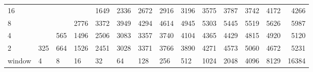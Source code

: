 \begin{table}[h]
{\begin{tabular}{lrrrrrrrrrrrrr}
			\multicolumn{1}{|l|}{16} &  &  &  & \cellcolor[HTML]{E69900}1649 & \cellcolor[HTML]{E60000}2336 & \cellcolor[HTML]{E60000}2672 & \cellcolor[HTML]{E60000}2916 & \cellcolor[HTML]{E60000}3196 & \cellcolor[HTML]{9900E6}3575 & \cellcolor[HTML]{9900E6}3787 & \cellcolor[HTML]{9900E6}3742 & \cellcolor[HTML]{9900E6}4172 & \cellcolor[HTML]{4C00E6}4266 \\ \cline{1-1}
			\multicolumn{1}{|l|}{8} &  &  & \cellcolor[HTML]{E60000}2776 & \cellcolor[HTML]{9900E6}3372 & \cellcolor[HTML]{9900E6}3949 & \cellcolor[HTML]{4C00E6}4294 & \cellcolor[HTML]{4C00E6}4614 & \cellcolor[HTML]{4C00E6}4945 & \cellcolor[HTML]{4C00E6}5303 & \cellcolor[HTML]{4C00E6}5445 & \cellcolor[HTML]{4C00E6}5519 & \cellcolor[HTML]{4C00E6}5626 & \cellcolor[HTML]{4C00E6}5987 \\ \cline{1-1}
			\multicolumn{1}{|l|}{4} &  & \cellcolor[HTML]{99E600}565 & \cellcolor[HTML]{E69900}1496 & \cellcolor[HTML]{E60000}2506 & \cellcolor[HTML]{9900E6}3083 & \cellcolor[HTML]{9900E6}3357 & \cellcolor[HTML]{9900E6}3740 & \cellcolor[HTML]{4C00E6}4104 & \cellcolor[HTML]{4C00E6}4365 & \cellcolor[HTML]{4C00E6}4429 & \cellcolor[HTML]{4C00E6}4815 & \cellcolor[HTML]{4C00E6}4920 & \cellcolor[HTML]{4C00E6}5120 \\ \cline{1-1}
			\multicolumn{1}{|l|}{2} & \cellcolor[HTML]{99E600}325 & \cellcolor[HTML]{99E600}664 & \cellcolor[HTML]{E69900}1526 & \cellcolor[HTML]{E60000}2451 & \cellcolor[HTML]{9900E6}3028 & \cellcolor[HTML]{9900E6}3371 & \cellcolor[HTML]{9900E6}3766 & \cellcolor[HTML]{9900E6}3890 & \cellcolor[HTML]{4C00E6}4271 & \cellcolor[HTML]{4C00E6}4573 & \cellcolor[HTML]{4C00E6}5060 & \cellcolor[HTML]{4C00E6}4672 & \cellcolor[HTML]{4C00E6}5231 \\ \cline{1-1}
			\multicolumn{1}{l|}{window} & \multicolumn{1}{l|}{4} & \multicolumn{1}{l|}{8} & \multicolumn{1}{l|}{16} & \multicolumn{1}{l|}{32} & \multicolumn{1}{l|}{64} & \multicolumn{1}{l|}{128} & \multicolumn{1}{l|}{256} & \multicolumn{1}{l|}{512} & \multicolumn{1}{l|}{1024} & \multicolumn{1}{l|}{2048} & \multicolumn{1}{l|}{4096} & \multicolumn{1}{l|}{8129} & \multicolumn{1}{l|}{16384} \\ \cline{2-14}
		\end{tabular}
	}
\end{table}

